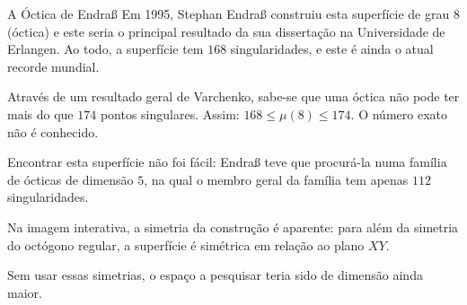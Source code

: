 \begin{surferPage}{A \'Octica de Endra\ss{}}
     Em 1995, Stephan Endra\ss{} construiu esta superf\'icie de grau $8$ (\'octica) e este seria o principal resultado da sua disserta\c c\~ao na Universidade de Erlangen.
    Ao todo, a superf\'icie tem $168$ singularidades, e este \'e ainda o atual recorde mundial.
  
     Atrav\'es de um resultado geral de Varchenko, sabe-se que uma \'octica n\~ao pode ter mais do que $174$ pontos singulares.
    Assim: $168 \le \mu(8) \le 174$. 
    O n\'umero exato n\~ao \'e conhecido.

     Encontrar esta superf\'icie n\~ao foi f\'acil: Endra\ss{} teve que procur\'a-la numa fam\'ilia de \'octicas de dimens\~ao $5$, na qual o membro geral da fam\'ilia tem apenas $112$ singularidades.

    Na imagem interativa, a simetria da constru\c c\~ao \'e aparente: 
    para al\'em da simetria do oct\'ogono regular, a superf\'icie \'e sim\'etrica em rela\c c\~ao ao plano $XY$.

    Sem usar essas simetrias, o espa\c co a pesquisar teria sido de dimens\~ao ainda maior.
\end{surferPage}
